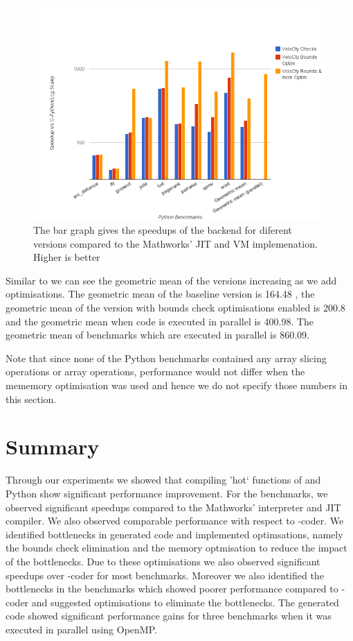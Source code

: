 \begin{figure}[htbp]
\centering
\includegraphics[scale=0.5]{Figures/final_py.png}
\caption[Summary of Python Results]{The bar graph gives the speedups of the \velocty backend for diferent \velocty versions compared to the Mathworks' JIT and VM implemenation. Higher is better }
\label{fig:results_final}
\end{figure}

Similar to \matlab we can see the geometric mean of the \velocty versions increasing as we add optimisations. The geometric mean of the baseline \velocty version is 164.48 , the geometric mean of the version with bounds check optimisations enabled is 200.8 and the geometric mean when \velocty code is executed in parallel is 400.98. The geometric mean of benchmarks which are executed in parallel is 860.09.

Note that since none of the Python benchmarks contained any array slicing operations or array operations, performance would not differ when the mememory optimisation was used and hence we do not specify those numbers in this section. 
\section{Summary}
Through our experiments we showed that compiling 'hot` functions of \matlab and Python show significant performance improvement. 
For the \matlab benchmarks, we observed significant  speedups compared to the Mathworks' \matlab interpreter and JIT compiler. We also observed comparable performance with respect to \matlab-coder. We identified bottlenecks in generated code and implemented optimsations, namely the bounds check elimination and the memory optmisation to reduce the impact of the bottlenecks. Due to these optimisations we also observed significant speedups over \matlab-coder for most benchmarks. Moreover we also identified the bottlenecks in the benchmarks which showed poorer performance compared to \matlab-coder and suggested optimisations to eliminate the bottlenecks. The generated code showed significant performance gains for three benchmarks when it was executed in parallel using OpenMP.

